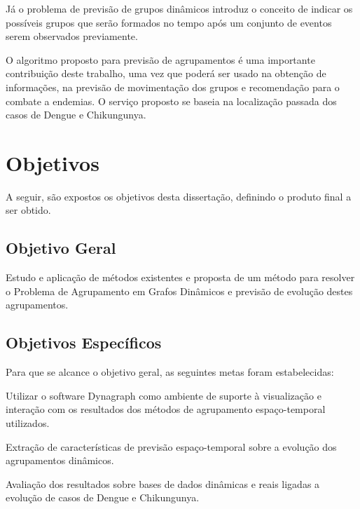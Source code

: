 Já o problema de previsão de grupos dinâmicos introduz o conceito de indicar os
possíveis grupos que serão formados no tempo após um conjunto de eventos serem
observados previamente.

O algoritmo proposto para previsão de agrupamentos é uma importante contribuição
deste trabalho, uma vez que poderá ser usado na obtenção de informações, na previsão de movimentação dos grupos e recomendação para o combate a endemias. O serviço proposto se baseia na localização passada dos casos de Dengue e Chikungunya.



\section{Objetivos}
\label{sec:objetivos}
A seguir, são expostos os objetivos desta dissertação, definindo o produto
final a ser obtido.

\subsection{Objetivo Geral}

Estudo e aplicação de métodos existentes e proposta de um método para resolver o Problema de Agrupamento
em Grafos Dinâmicos e previsão de evolução destes agrupamentos.

\subsection{Objetivos Específicos}
\label{sec:objetivos-especificos}

Para que se alcance o objetivo geral, as seguintes metas foram estabelecidas:

\begin{alineas}
	\item Utilizar o software Dynagraph como ambiente de suporte à visualização e interação com os resultados dos métodos de agrupamento espaço-temporal utilizados.
	\item Extração de características de previsão espaço-temporal sobre a evolução dos agrupamentos dinâmicos.
	\item Avaliação dos resultados sobre bases de dados dinâmicas e reais ligadas a evolução de casos de Dengue e Chikungunya.
\end{alineas}

